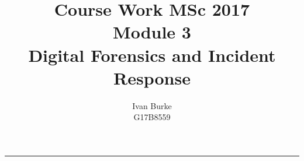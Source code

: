 \documentclass[12pt, british]{article}
\begin{document}
%

\title{Course Work MSc 2017\\
Module 3\\
Digital Forensics and Incident Response}


\author{Ivan Burke\\
G17B8559}

\maketitle
\noindent \begin{center}
\rule[0.5ex]{1\linewidth}{1pt}
\par\end{center}

\def\thesection{\Alph{section}}









  
 
\end{document}
